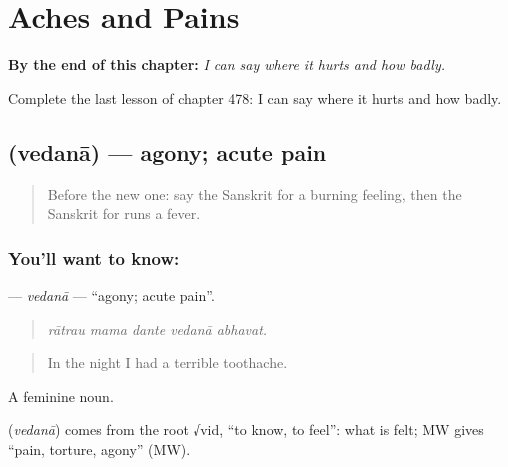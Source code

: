 
\chapter{Aches and Pains}
\label{ch:sa-aches-and-pains}

\begin{chapteropening}
\textbf{By the end of this chapter:} \emph{I can say where it hurts and how badly.}

Complete the last lesson of chapter 478: I can say where it hurts and how badly.
\end{chapteropening}

\section[\texorpdfstring{\sk{वेदना} (vedanā)}{वेदना (vedanā)}]{ (vedanā) — agony; acute pain}

\label{lesson:SA-C478-vedana}



\begin{quote}
Before the new one: say the Sanskrit for a burning feeling, then the Sanskrit for runs a fever.
\end{quote}

\subsection*{You'll want to know: }
\textbf{} — \emph{vedanā} — \textquotedblleft{}agony; acute pain\textquotedblright{}.

\begin{quote}
    
\end{quote}

\begin{quote}
\emph{rātrau mama dante vedanā abhavat.}
\end{quote}

\begin{quote}
In the night I had a terrible toothache.
\end{quote}

A feminine noun.

\begin{cousinweb}
\textbf{} (\emph{vedanā}) comes from the root √vid, \textquotedblleft{}to know, to feel\textquotedblright{}: what is felt; MW gives \textquotedblleft{}pain, torture, agony\textquotedblright{} (MW).
\end{cousinweb}

